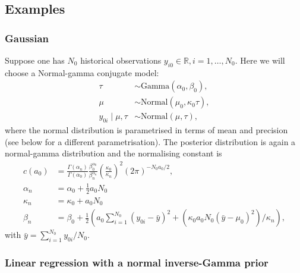 \documentclass[a4paper, notitlepage, 11pt]{article}
\begin{document}
\subsection{Examples}
\label{sec:examples}

\subsubsection{Gaussian}
\label{sec:gaussian_ex}

Suppose one has $N_0$ historical observations $y_{i0} \in \mathbb{R}, i = 1, \ldots, N_0$.
Here we will choose a Normal-gamma conjugate model:
\begin{align*}
 \tau &\sim \text{Gamma}(\alpha_0, \beta_0),\\
 \mu &\sim \text{Normal}(\mu_0, \kappa_0\tau ),\\
 y_{0i} \mid \mu, \tau &\sim \text{Normal}(\mu, \tau),
\end{align*}
where the normal distribution is parametrised in terms of mean and precision (see below for a different parametrisation).
The posterior distribution is again a normal-gamma distribution and the normalising constant is
\begin{align}
 \label{eq:cA0_gaussian}
 c(a_0) &= \frac{\Gamma(\alpha_n)}{\Gamma(\alpha_0)}\frac{\beta_0^{\alpha_0}}{\beta_n^{\alpha_n}} \left(\frac{\kappa_0}{\kappa_n} \right)^2 (2\pi)^{-N_0 a_0/2},\\
 \nonumber
 \alpha_n &= \alpha_0 + \frac{1}{2}a_0N_0 \\
 \nonumber
 \kappa_n &= \kappa_0 + a_0N_0 \\
 \nonumber
 \beta_n  &= \beta_0 + \frac{1}{2}\left( a_0\sum_{i=1}^{N_0}(y_{0i}-\bar{y})^2 + \left(\kappa_0 a_0 N_0 (\bar{y}-\mu_0)^2\right)/\kappa_n \right),
\end{align}
with $\bar{y} = \sum_{i=1}^{N_0} y_{0i}/N_0$.

\subsubsection{Linear regression with a normal inverse-Gamma prior}
\label{sec:linreg_ex}
\end{document}
